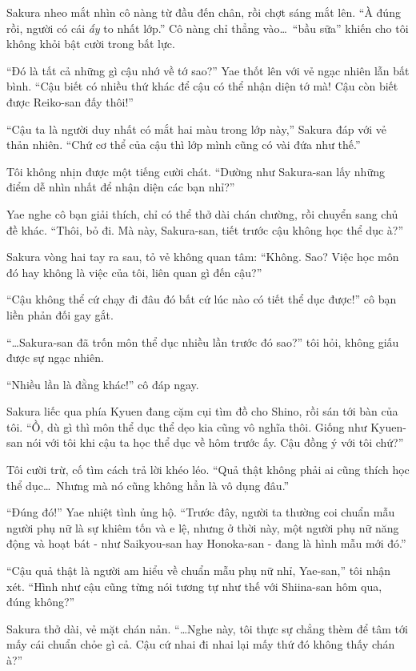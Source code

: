\documentclass[../main.tex]{subfiles}
\begin{document}
Sakura nheo mắt nhìn cô nàng từ đầu đến chân, rồi chợt sáng mắt lên. ``À đúng rồi, người có cái \emph{ấy} to nhất lớp.'' Cô nàng chỉ thẳng vào\dots\ ``bầu sữa'' khiến cho tôi không khỏi bật cười trong bất lực.

``Đó là tất cả những gì cậu nhớ về tớ sao?'' Yae thốt lên với vẻ ngạc nhiên lẫn bất bình. ``Cậu biết có nhiều thứ khác để cậu có thể nhận diện tớ mà! Cậu còn biết được Reiko-san đấy thôi!''

``Cậu ta là người duy nhất có mắt hai màu trong lớp này,'' Sakura đáp với vẻ thản nhiên. ``Chứ cơ thể của cậu thì lớp mình cũng có vài đứa như thế.''

Tôi không nhịn được một tiếng cười chát. ``Dường như Sakura-san lấy những điểm dễ nhìn nhất để nhận diện các bạn nhỉ?''

Yae nghe cô bạn giải thích, chỉ có thể thở dài chán chường, rồi chuyển sang chủ đề khác. ``Thôi, bỏ đi. Mà này, Sakura-san, tiết trước cậu không học thể dục à?''

Sakura vòng hai tay ra sau, tỏ vẻ không quan tâm: ``Không. Sao? Việc học môn đó hay không là việc của tôi, liên quan gì đến cậu?''

``Cậu không thể cứ chạy đi đâu đó bất cứ lúc nào có tiết thể dục được!'' cô bạn liền phản đối gay gắt.

``\dots Sakura-san đã trốn môn thể dục nhiều lần trước đó sao?'' tôi hỏi, không giấu được sự ngạc nhiên.

``Nhiều lần là đằng khác!'' cô đáp ngay.

Sakura liếc qua phía Kyuen đang cặm cụi tìm đồ cho Shino, rồi sán tới bàn của tôi. ``Ồ, dù gì thì môn thể dục thể dẹo kia cũng vô nghĩa thôi. Giống như Kyuen-san nói với tôi khi cậu ta học thể dục về hôm trước ấy. Cậu đồng ý với tôi chứ?''

Tôi cười trừ, cố tìm cách trả lời khéo léo. ``Quả thật không phải ai cũng thích học thể dục\dots\ Nhưng mà nó cũng không hẳn là vô dụng đâu.''

``Đúng đó!'' Yae nhiệt tình ủng hộ. ``Trước đây, người ta thường coi chuẩn mẫu người phụ nữ là sự khiêm tốn và e lệ, nhưng ở thời này, một người phụ nữ năng động và hoạt bát - như Saikyou-san hay Honoka-san - đang là hình mẫu mới đó.''

``Cậu quả thật là người am hiểu về chuẩn mẫu phụ nữ nhỉ, Yae-san,'' tôi nhận xét. ``Hình như cậu cũng từng nói tương tự như thế với Shiina-san hôm qua, đúng không?''

Sakura thở dài, vẻ mặt chán nản. ``\dots Nghe này, tôi thực sự chẳng thèm để tâm tới mấy cái chuẩn chỏe gì cả. Cậu cứ nhai đi nhai lại mấy thứ đó không thấy chán à?''
\end{document}
